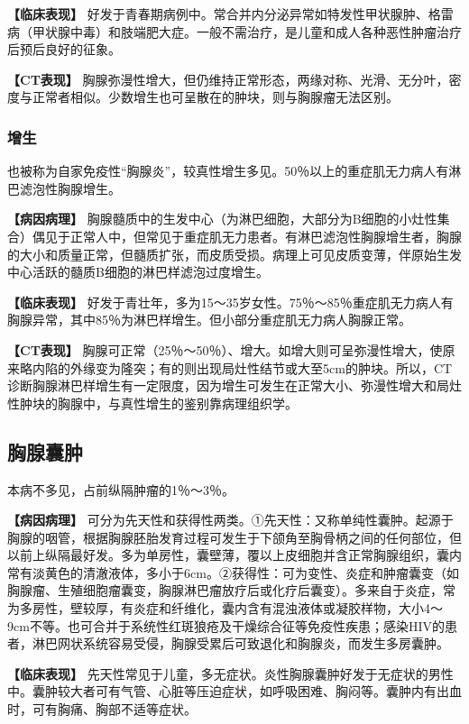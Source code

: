 \textbf{【临床表现】}
好发于青春期病例中。常合并内分泌异常如特发性甲状腺肿、格雷病（甲状腺中毒）和肢端肥大症。一般不需治疗，是儿童和成人各种恶性肿瘤治疗后预后良好的征象。

\textbf{【CT表现】}
胸腺弥漫性增大，但仍维持正常形态，两缘对称、光滑、无分叶，密度与正常者相似。少数增生也可呈散在的肿块，则与胸腺瘤无法区别。

\subsubsection{增生}

也被称为自家免疫性“胸腺炎”，较真性增生多见。50％以上的重症肌无力病人有淋巴滤泡性胸腺增生。

\textbf{【病因病理】}
胸腺髓质中的生发中心（为淋巴细胞，大部分为B细胞的小灶性集合）偶见于正常人中，但常见于重症肌无力患者。有淋巴滤泡性胸腺增生者，胸腺的大小和质量正常，但髓质扩张，而皮质受损。病理上可见皮质变薄，伴原始生发中心活跃的髓质B细胞的淋巴样滤泡过度增生。

\textbf{【临床表现】}
好发于青壮年，多为15～35岁女性。75％～85％重症肌无力病人有胸腺异常，其中85％为淋巴样增生。但小部分重症肌无力病人胸腺正常。

\textbf{【CT表现】}
胸腺可正常（25％～50％）、增大。如增大则可呈弥漫性增大，使原来略内陷的外缘变为隆突；有的则出现局灶性结节或大至5cm的肿块。所以，CT诊断胸腺淋巴样增生有一定限度，因为增生可发生在正常大小、弥漫性增大和局灶性肿块的胸腺中，与真性增生的鉴别靠病理组织学。

\subsection{胸腺囊肿}

本病不多见，占前纵隔肿瘤的1％～3％。

\textbf{【病因病理】}
可分为先天性和获得性两类。①先天性：又称单纯性囊肿。起源于胸腺的咽管，根据胸腺胚胎发育过程可发生于下颌角至胸骨柄之间的任何部位，但以前上纵隔最好发。多为单房性，囊壁薄，覆以上皮细胞并含正常胸腺组织，囊内常有淡黄色的清澈液体，多小于6cm。②获得性：可为变性、炎症和肿瘤囊变（如胸腺瘤、生殖细胞瘤囊变，胸腺淋巴瘤放疗后或化疗后囊变）。多来自于炎症，常为多房性，壁较厚，有炎症和纤维化，囊内含有混浊液体或凝胶样物，大小4～9cm不等。也可合并于系统性红斑狼疮及干燥综合征等免疫性疾患；感染HIV的患者，淋巴网状系统容易受侵，胸腺受累后可致退化和胸腺炎，而发生多房囊肿。

\textbf{【临床表现】}
先天性常见于儿童，多无症状。炎性胸腺囊肿好发于无症状的男性中。囊肿较大者可有气管、心脏等压迫症状，如呼吸困难、胸闷等。囊肿内有出血时，可有胸痛、胸部不适等症状。

